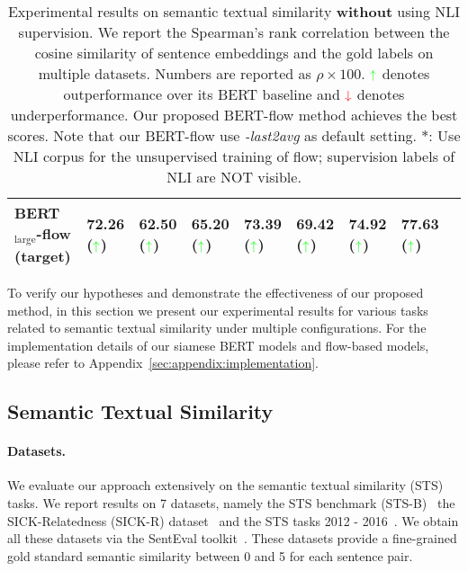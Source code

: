\documentclass[11pt,a4paper]{article}
\newcommand*{\mathcolor}{}
\def\mathcolor#1#{\mathcoloraux{#1}}
\newcommand*{\mathcoloraux}[3]{\protect\leavevmode
  \begingroup
    \color#1{#2}#3\endgroup
}
\begin{document}
\begin{table*}[!h]
\begin{center}
{\begin{tabular}{l llllllll}
BERT$_{\text{large}}$-flow (target) & \bf 72.26 ($\mathcolor{green}{\uparrow}$)	& 62.50	($\mathcolor{green}{\uparrow}$) & \bf 65.20	($\mathcolor{green}{\uparrow}$) & \bf 73.39 ($\mathcolor{green}{\uparrow}$)	& \bf 69.42 ($\mathcolor{green}{\uparrow}$)	& \bf 74.92 ($\mathcolor{green}{\uparrow}$)	& \bf 77.63 ($\mathcolor{green}{\uparrow}$) \\
\bottomrule
\end{tabular}
}
\caption{
Experimental results on semantic textual similarity \textbf{without} using NLI supervision.
We report the Spearman's rank correlation between the cosine similarity of sentence embeddings and the gold labels on multiple datasets. Numbers are reported as $\rho \times 100$. $\mathcolor{green}{\uparrow}$ denotes outperformance over its BERT baseline and $\mathcolor{red}{\downarrow}$ denotes underperformance. Our proposed BERT-flow method achieves the best scores. Note that our BERT-flow use \textit{-last2avg} as default setting. $*$: Use NLI corpus for the unsupervised training of flow; supervision labels of NLI are NOT visible.  }
\label{tbl:exp:no:nli}
\end{center}
\vspace{-20pt}
\end{table*}


To verify our hypotheses and demonstrate the effectiveness of our proposed method, in this section we present our experimental results for various tasks related to semantic textual similarity under multiple configurations. For the implementation details of our siamese BERT models and flow-based models, please refer to Appendix~\ref{sec:appendix:implementation}.



\subsection{Semantic Textual Similarity}

\paragraph{Datasets.}
We evaluate our approach extensively on the semantic textual similarity (STS) tasks. We report results on 7 datasets, namely the STS benchmark (STS-B)~\citep{cer2017semeval}
the SICK-Relatedness (SICK-R) dataset~\citep{marelli2014sick} and the
STS tasks 2012 - 2016~\citep{agirre2012semeval,agirre2013sem,agirre2014semeval,agirre2015semeval,agirre2016semeval}. We obtain all these datasets via the SentEval toolkit~\citep{conneau2018senteval}. These datasets provide a fine-grained gold standard semantic similarity between 0 and 5 for each sentence pair.
\end{document}
